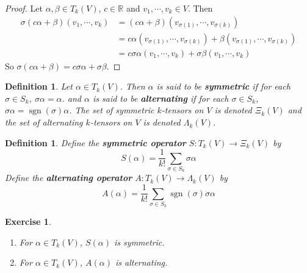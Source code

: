 \documentclass[12pt]{amsart}
\newtheorem{defn}[thm]{Definition}
\newtheorem{ex}[thm]{Exercise}
\newcommand{\al}{\alpha}
\newcommand{\Lam}{\Lambda}
\newcommand{\sig}{\sigma}
\newcommand{\R}{\mathbb{R}}
\DeclareMathOperator{\sgn}{sgn}
\begin{document}
	\begin{proof}
		Let $\al, \beta \in T_k(V)$, $c \in \R$ and $v_1, \cdots, v_k \in V$. Then 
		\begin{align*}
			\sig(c\al + \beta)(v_1, \cdots, v_k) 
			&= (c\al + \beta)(v_{\sig(1)}, \cdots, v_{\sig(k)}) \\
			&= c \al(v_{\sig(1)}, \cdots, v_{\sig(k)}) + \beta(v_{\sig(1)}, \cdots, v_{\sig(k)}) \\
			&= c \sig \al(v_1, \cdots, v_k) + \sig \beta(v_1, \cdots, v_k)
		\end{align*}
		So $\sig(c \al + \beta) = c\sig \al + \sig \beta$.
	\end{proof}
	
	\begin{defn}
		Let $\al \in T_k(V)$. Then $\al$ is said to be \textbf{symmetric} if for each $\sig \in S_k$, $\sig \al = \al$. and $\al$ is said to be \textbf{alternating} if for each $\sig \in S_k$, $\sig \al = \sgn(\sig) \al$.  The set of symmetric $k$-tensors on $V$ is denoted $\Xi_k(V)$ and the set of alternating $k$-tensors on $V$ is denoted $\Lam_k(V)$.
	\end{defn}

	\begin{defn}
		Define the \textbf{symmetric operator} $S: T_k(V) \rightarrow \Xi_k(V)$ by $$S(\al) = \frac{1}{k!}\sum_{\sig \in S_k} \sig \al$$  Define the \textbf{alternating operator} $A: T_k(V) \rightarrow \Lam_k(V)$ by $$A(\al) = \frac{1}{k!}\sum_{\sig \in S_k} \sgn(\sig)\sig \al$$
	\end{defn}
	
	\begin{ex}\
		\begin{enumerate}
			\item For $\al \in T_k(V)$, $S(\al)$ is symmetric.
			\item For $\al \in T_k(V)$, $A(\al)$ is alternating.
		\end{enumerate}
	\end{ex}
\end{document}
